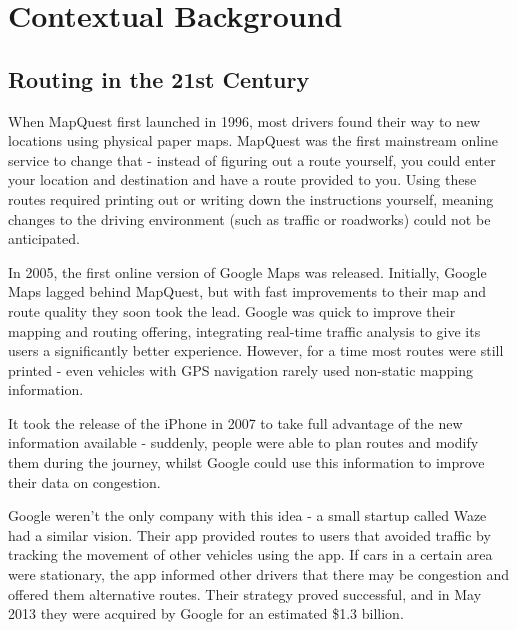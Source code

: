 \documentclass[ %
                    author={Alexander Hill},
                supervisor={Dr. Benjamin Sach},
                    degree={MEng},
                     title={MARMOSET},
                  subtitle={Multi-Agent Route Management using Online Simulation for Efficient Transportation},
                      type={research},
                      year={2016} ]{dissertation}
\begin{document}
\mainmatter


\chapter{Contextual Background}
\label{chap:context}

\vspace{1cm}

\noindent

\section{Routing in the 21st Century}

When MapQuest first launched in 1996, most drivers found their way to new
locations using physical paper maps. MapQuest was the first mainstream online
service to change that - instead of figuring out a route yourself, you could
enter your location and destination and have a route provided to you. Using
these routes required printing out or writing down the instructions yourself,
meaning changes to the driving environment (such as traffic or roadworks) could
not be anticipated.

In 2005, the first online version of Google Maps was released. Initially, Google
Maps lagged behind MapQuest, but with fast improvements to their map and route
quality they soon took the lead. Google was quick to improve their mapping and
routing offering, integrating real-time traffic analysis to give its users a
significantly better experience. However, for a time most routes were still
printed - even vehicles with GPS navigation rarely used non-static mapping
information.

It took the release of the iPhone in 2007 to take full advantage of the new
information available - suddenly, people were able to plan routes and modify
them during the journey, whilst Google could use this information to improve
their data on congestion.

Google weren't the only company with this idea - a small startup called Waze had
a similar vision. Their app provided routes to users that avoided traffic by
tracking the movement of other vehicles using the app. If cars in a
certain area were stationary, the app informed other drivers that there may be
congestion and offered them alternative routes. Their strategy proved
successful, and in May 2013 they were acquired by Google for an estimated \$1.3
billion.
\end{document}
